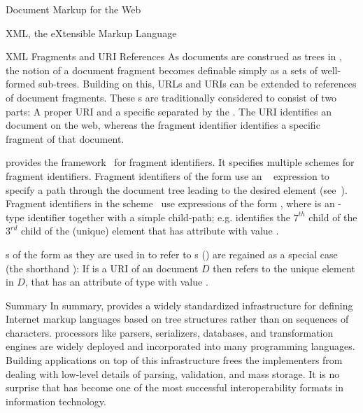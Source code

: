 \begin{tchapter}[id=markup-web]{Document Markup for the Web}
\begin{tsection}[id=xml]{XML, the eXtensible Markup Language}
\begin{tsubsection}[id=xml-fragments]{XML Fragments and URI References}
  As documents are construed as trees in {\xml}, the notion of a document fragment becomes
  definable simply as a sets of well-formed sub-trees. Building on this, URLs and URIs can
  be extended to references of document fragments. These {s} are
  traditionally considered to consist of two parts: A proper URI and a specific
  {} separated by the {}
  {\snippet{\#}}. The URI identifies an {\xml} document on the web, whereas the fragment
  identifier identifies a specific fragment of that document.

  {\xml} provides the {\xpointer} framework~\cite{GroMal:xf03} for fragment
  identifiers. It specifies multiple schemes for fragment identifiers. Fragment
  identifiers of the form {} use an
  {\xpath}~\cite{ClaDeR:xpath99} expression {} to specify a path
  through the document tree leading to the desired element (see~\cite{DeRMal:xxs03}).
  Fragment identifiers in the {} scheme~\cite{GroMal:xes03} use
  expressions of the form {}, where
  {} is an {}-type identifier together
  with a simple child-path; e.g.  {} identifies the $7^{th}$
  child of the $3^{rd}$ child of the (unique) element that has {}
  attribute with value {}.

  {s} of the form {} as they
  are used in {\html} to refer to {s} ({}) are regained as a special case (the shorthand
  {}): If {} is a URI
  of an {\xml} document $D$ then {} refers to the
  unique element in $D$, that has an attribute of type {} with
  value {}.
\end{tsubsection}

\begin{tsubsection}[id=xml-summary]{Summary}
  In summary, {\xml} provides a widely standardized infrastructure for defining Internet
  markup languages based on tree structures rather than on sequences of characters. {\xml}
  processors like parsers, serializers, {\xml} databases, and {\xslt} transformation
  engines are widely deployed and incorporated into many programming languages. Building
  {\xml} applications on top of this infrastructure frees the implementers from dealing
  with low-level details of parsing, validation, and mass storage. It is no surprise that
  {\xml} has become one of the most successful interoperability formats in information
  technology.


\end{tsubsection}
\end{tsection}
\end{tchapter}
